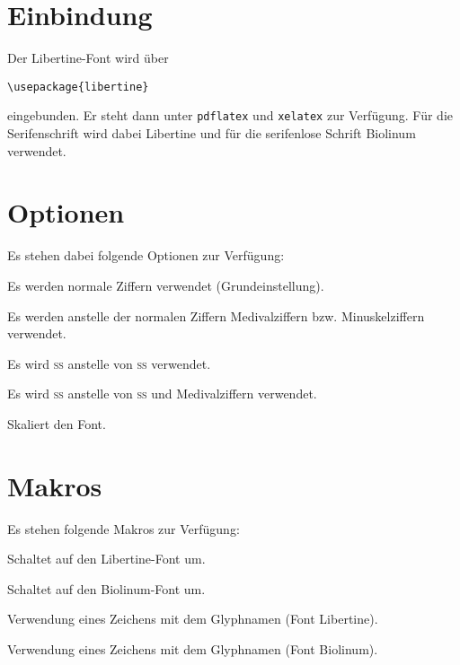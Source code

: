 \documentclass[ngerman]{libertinedoku}
\begin{document}

\section{Einbindung}

Der Libertine-Font wird über
\begin{lstlisting}
\usepackage{libertine}
\end{lstlisting}
eingebunden. Er steht dann unter \texttt{pdflatex} und \texttt{xelatex} zur Verfügung.
Für die Serifenschrift wird dabei Libertine und für die serifenlose Schrift Biolinum verwendet.

\section{Optionen}

Es stehen dabei folgende Optionen zur Verfügung:

\begin{eqlist}
\item [nf]  Es werden normale Ziffern verwendet (Grundeinstellung).
\item [osf] Es werden anstelle der normalen Ziffern Medivalziffern bzw. Minuskelziffern verwendet.
\item [ss]  Es wird \textsc{ss} anstelle von \textsc{ß} verwendet.
\item [osfss] Es wird \textsc{ss} anstelle von \textsc{ß} und Medivalziffern verwendet.
\item [scaled] Skaliert den Font.
\end{eqlist}

\section{Makros}

Es stehen folgende Makros zur Verfügung:

\begin{eqlist}
\item [libertine] Schaltet auf den Libertine-Font um.
\item [biolinum] Schaltet auf den Biolinum-Font um.
\item [libertineGlyph\{<glyphname>\}] Verwendung eines Zeichens mit dem Glyphnamen (Font Libertine).
\item [biolinumGlyph\{<glyphname>\}] Verwendung eines Zeichens mit dem Glyphnamen (Font Biolinum).
\end{eqlist}
\end{document}
